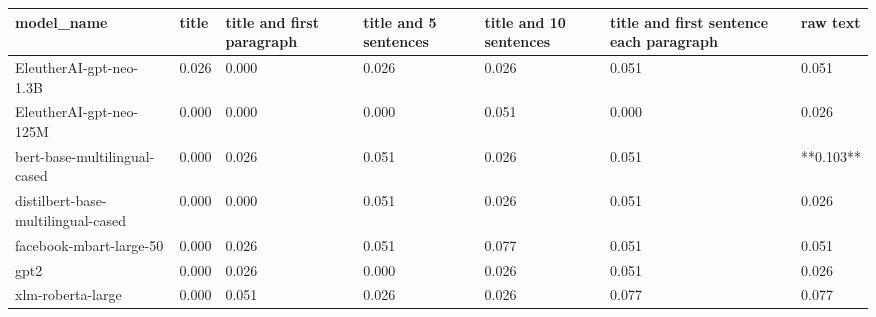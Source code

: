 \begin{tabular}{lllllll}
\toprule
                        model\_name & title & title and first paragraph & title and 5 sentences & title and 10 sentences & title and first sentence each paragraph &  raw text \\
\midrule
           EleutherAI-gpt-neo-1.3B & 0.026 &                     0.000 &                 0.026 &                  0.026 &                                   0.051 &     0.051 \\
           EleutherAI-gpt-neo-125M & 0.000 &                     0.000 &                 0.000 &                  0.051 &                                   0.000 &     0.026 \\
      bert-base-multilingual-cased & 0.000 &                     0.026 &                 0.051 &                  0.026 &                                   0.051 & **0.103** \\
distilbert-base-multilingual-cased & 0.000 &                     0.000 &                 0.051 &                  0.026 &                                   0.051 &     0.026 \\
           facebook-mbart-large-50 & 0.000 &                     0.026 &                 0.051 &                  0.077 &                                   0.051 &     0.051 \\
                              gpt2 & 0.000 &                     0.026 &                 0.000 &                  0.026 &                                   0.051 &     0.026 \\
                 xlm-roberta-large & 0.000 &                     0.051 &                 0.026 &                  0.026 &                                   0.077 &     0.077 \\
\bottomrule
\end{tabular}
